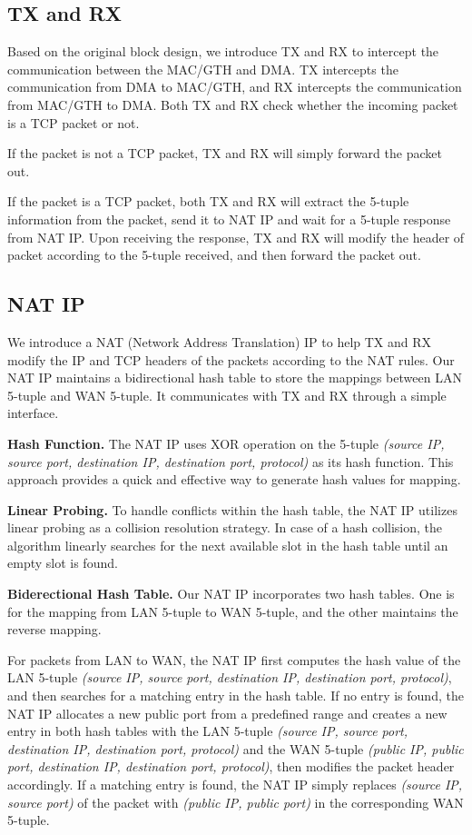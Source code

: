 \subsection{TX and RX}

    Based on the original block design, we introduce TX and RX to intercept the communication between the MAC/GTH and DMA. TX intercepts the communication from DMA to MAC/GTH, and RX intercepts the communication from MAC/GTH to DMA. Both TX and RX check whether the incoming packet is a TCP packet or not. 
    
    If the packet is not a TCP packet, TX and RX will simply forward the packet out.

    If the packet is a TCP packet, both TX and RX will extract the 5-tuple information from the packet, send it to NAT IP and wait for a 5-tuple response from NAT IP. Upon receiving the response, TX and RX will modify the header of packet according to the 5-tuple received, and then forward the packet out.

\subsection{NAT IP}

    We introduce a NAT (Network Address Translation) IP to help TX and RX modify the IP and TCP headers of the packets according to the NAT rules. Our NAT IP maintains a bidirectional hash table to store the mappings between LAN 5-tuple and WAN 5-tuple. It communicates with TX and RX through a simple interface. 

    \textbf{Hash Function.} The NAT IP uses XOR operation on the 5-tuple \emph{(source IP, source port, destination IP, destination port, protocol)} as its hash function. This approach provides a quick and effective way to generate hash values for mapping.

    \textbf{Linear Probing.} To handle conflicts within the hash table, the NAT IP utilizes linear probing as a collision resolution strategy. In case of a hash collision, the algorithm linearly searches for the next available slot in the hash table until an empty slot is found.

    \textbf{Biderectional Hash Table.} Our NAT IP incorporates two hash tables. One is for the mapping from LAN 5-tuple to WAN 5-tuple, and the other maintains the reverse mapping.

    For packets from LAN to WAN, the NAT IP first computes the hash value of the LAN 5-tuple \emph{(source IP, source port, destination IP, destination port, protocol)}, and then searches for a matching entry in the hash table. If no entry is found, the NAT IP allocates a new public port from a predefined range and creates a new entry in both hash tables with the LAN 5-tuple \emph{(source IP, source port, destination IP, destination port, protocol)} and the WAN 5-tuple \emph{(public IP, public port, destination IP, destination port, protocol)}, then modifies the packet header accordingly. If a matching entry is found, the NAT IP simply replaces \emph{(source IP,  source port)} of the packet with \emph{(public IP, public port)} in the corresponding WAN 5-tuple.

